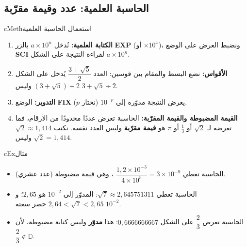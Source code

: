 \documentclass[12pt,a4paper]{article}
\newenvironment{BOX}[2]{\begin{otherlanguage}{english}\begin{arbox}{#1}{#2}}{\end{arbox}\end{otherlanguage}}
\newenvironment{mithal}[1][مثال]{\begin{BOX}{cEx}{#1}}{\end{BOX}}
\newenvironment{tariqa}[1][طريقة]{\begin{BOX}{cMeth}{#1}}{\end{BOX}}
\newcommand{\D}{\mathbb{D}}
\begin{document}
\subsection{الحاسبة العلمية: عدد وقيمة مقرّبة}
\begin{tariqa}[استعمال الحاسبة العلمية]
\begin{enumerate}
\item \textbf{الكتابة العلمية:} نُدخل $a\times10^{n}$ بالزر \textbf{EXP} (أو $\times10^{x}$)، ونضبط العرض على الوضع \textbf{SCI} لقراءة النتيجة على الشكل $a\times10^{n}$.
\item \textbf{الأقواس:} نضع البسط والمقام بين قوسين: العدد $\dfrac{3+\sqrt{5}}{2}$ يُدخل على الشكل $(3+\sqrt{5})\div2$ وليس $3+\sqrt{5}\div2$.
\item \textbf{التدوير:} الوضع \textbf{FIX} يعرض النتيجة مدوّرة إلى $10^{-p}$ (نختار $p$).
\item \textbf{القيمة المضبوطة والقيمة المقرّبة:} الحاسبة تعرض عددًا محدودًا من الأرقام، فما تعرضه لـ $\sqrt{2}$ أو $\frac{1}{3}$ أو $\pi$ هو \textbf{قيمة مقرّبة} وليس العدد نفسه. نكتب $\sqrt{2}\approx1{,}414$ وليس $\sqrt{2}=1{,}414$.
\end{enumerate}
\end{tariqa}
\begin{mithal}
\begin{itemize}
\item الحاسبة تعطي $\dfrac{1{,}2\times10^{-3}}{4\times10^{5}}=3\times10^{-9}$ ، وهي قيمة مضبوطة (عدد عشري).
\item الحاسبة تعطي $\sqrt{7}\approx2{,}645751311$: المدوّر إلى $10^{-2}$ هو $2{,}65$؛ و $2{,}64<\sqrt{7}<2{,}65$ حصر سعته $10^{-2}$.
\item الحاسبة تعرض $\dfrac{2}{3}$ على الشكل $0{,}6666666667$: هذا \textbf{مدوّر} وليس كتابة مضبوطة، لأن $\dfrac{2}{3}\notin\D$.
\end{itemize}
\end{mithal}

\end{document}
